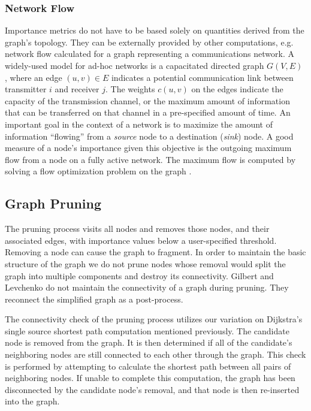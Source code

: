\subsubsection{Network Flow}
Importance metrics do not have to be based solely on quantities derived from the graph's topology.  They can be externally provided by other computations, e.g. network flow calculated for a graph representing a communications network.  A widely-used model for ad-hoc networks is a capacitated directed graph $G(V,E)$ \cite{AMO:flows}, where an edge $(u,v)\in E$ indicates a potential communication link between transmitter $i$ and receiver $j$. The weights $c(u,v)$ on the edges indicate the capacity of the transmission channel, or the maximum amount of information that can be transferred on that channel in a pre-specified amount of time. An important goal in the context of a network is to maximize the amount of information ``flowing'' from a \textit{source} node to a destination (\textit{sink}) node. A good measure of a node's importance given this objective is the outgoing maximum flow from a node on a fully active network.  The maximum flow is computed by solving a flow optimization problem on the graph \cite{Fridman08}.

\subsection{Graph Pruning}

The pruning process visits all nodes and removes those nodes, and their associated edges, with importance values below a user-specified threshold.  Removing a node can cause the graph to fragment.  In order to maintain the basic structure of the graph we do not prune nodes whose removal would split the graph into multiple components and destroy its connectivity.  Gilbert and Levchenko \cite{Gilbert-Levchenko04} do not maintain the connectivity of a graph during pruning.  They reconnect the simplified graph as a post-process.

The connectivity check of the pruning process utilizes our variation on Dijkstra's single source shortest path computation mentioned previously. The candidate node is removed from the graph.  It is then determined if all of the candidate's neighboring nodes are still connected to each other through the graph.  This check is performed by attempting to calculate the shortest path between all pairs of neighboring nodes.  If unable to complete this computation, the graph has been disconnected by the candidate node's removal, and that node is then re-inserted into the graph. 

